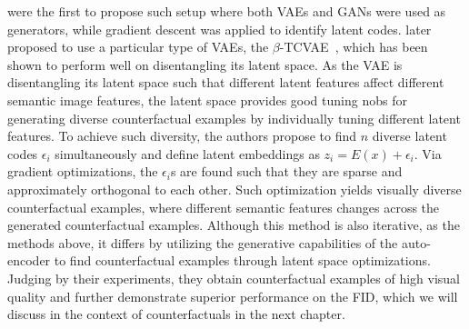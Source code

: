 \documentclass[11pt,a4paper,twoside,openright,final]{memoir}
\begin{document}
\citet{Joshi2018} were the first to propose such setup where both VAEs and GANs were used as generators, while gradient descent was applied to identify latent codes. 
\citet{Rodriguez2021} later proposed to use a particular type of VAEs, the $\beta$-TCVAE~\cite{disentangle_vae}, which has been shown to perform well on disentangling its latent space.
%
As the VAE is disentangling its latent space such that different latent features affect different semantic image features, the latent space provides good tuning nobs for generating diverse counterfactual examples by individually tuning different latent features.
To achieve such diversity, the authors propose to find $n$ diverse latent codes $\epsilon_i$ simultaneously and define latent embeddings as $z_i = E(x) + \epsilon_i$. %
Via gradient optimizations, the $\epsilon_i$s are found such that they are sparse and approximately orthogonal to each other.
Such optimization yields visually diverse counterfactual examples, where different semantic features changes across the generated counterfactual examples.
Although this method is also iterative, as the methods above, it differs by utilizing the generative capabilities of the auto-encoder to find counterfactual examples through latent space optimizations.
Judging by their experiments, they obtain counterfactual examples of high visual quality and further demonstrate superior performance on the FID, which we will discuss in the context of counterfactuals in the next chapter.

\end{document}
